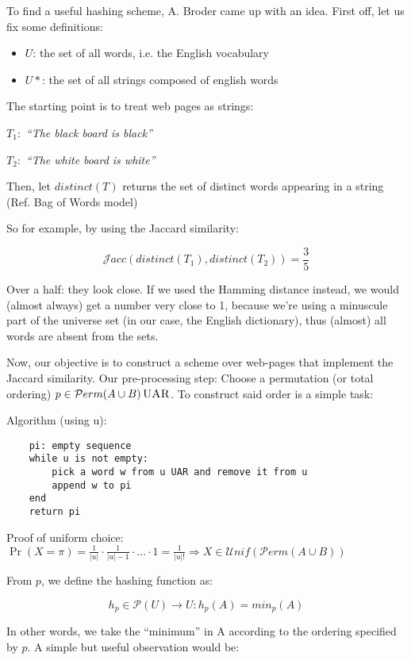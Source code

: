 \documentclass{report}
\newcommand{\unifdist}{\mathcal{U}nif}
\newcommand{\uar}{\,\textsc{UAR}}
\newcommand{\jaccsim}{\mathcal{J}acc}
\newcommand{\permut}{\mathcal{P}erm}
\newcommand{\order}{\permut}
\begin{document}
	To find a useful hashing scheme, A. Broder came up with an idea. First off, let us fix some definitions:
	\begin{itemize}
	\item $U$: the set of all words, i.e. the English vocabulary
	\item $U*$: the set of all strings composed of english words
	\end{itemize}
	
	The starting point is to treat web pages as strings:
	
	$T_1:$ \textit{``The black board is black''}
	
	$T_2:$ \textit{``The white board is white''}
	
	Then, let $distinct(T)$ returns the set of distinct words appearing in a string (Ref. Bag of Words model)
	
	So for example, by using the Jaccard similarity:
    
    \begin{equation}
    \jaccsim(distinct(T_1), distinct(T_2))= \frac{3}{5}
    \end{equation}
	
	Over a half: they look close. If we used the Hamming distance instead, we would (almost always) get a number very close to 1, because we're using a minuscule part of the universe set (in our case, the English dictionary), thus (almost) all words are absent from the sets.
	
	Now, our objective is to construct a scheme over web-pages that implement the Jaccard similarity. Our pre-processing step: Choose a permutation (or total ordering) $p \in \order(A \cup B) \uar$. To construct said order is a simple task:
	
	Algorithm (using u):
	\begin{verbatim}
	pi: empty sequence
	while u is not empty:
		pick a word w from u UAR and remove it from u
		append w to pi
	end
	return pi
	\end{verbatim}
	
	Proof of uniform choice: $\Pr(X = \pi) = \frac{1}{|u|}\cdot\frac{1}{|u|-1}\cdot\dots\cdot 1 = \frac{1}{|u|!} \Rightarrow X \in \unifdist(\permut(A \cup B))$
	
	From $p$, we define the hashing function as:
	
	\begin{equation}
	h_p \in \mathcal{P}(U) \to U : h_p(A) = min_p(A)
	\end{equation}
	
	In other words, we take the ``minimum'' in A according to the ordering specified by $p$. A simple but useful observation would be:
	
\end{document}
